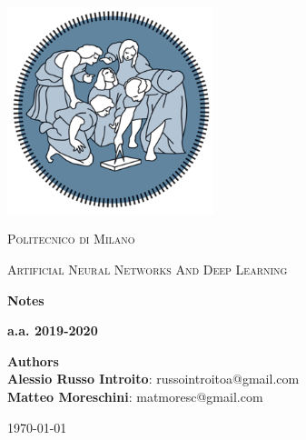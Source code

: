 \documentclass[12pt,a4paper]{article}
\begin{document}
\begin{titlepage}
	\centering
	\includegraphics[width=0.45\textwidth]{images/polimi.png}\par\vspace{1cm}
	{\scshape\LARGE Politecnico di Milano \par}
	\vspace{1cm}
	{\scshape\Large Artificial Neural Networks And Deep Learning \par}
	\vspace{1.5cm}
	{\LARGE\bfseries Notes\par}
	{\LARGE\bfseries a.a. 2019-2020\par}
	\vspace{0.7cm}
	{\textbf{Authors}\\
	\textbf{Alessio Russo Introito}: russointroitoa@gmail.com \\
	\textbf{Matteo Moreschini}: matmoresc@gmail.com \\
    }
	\vfill
	{\large \today\par}
\end{titlepage}



\tableofcontents

\newpage

%










%

\end{document}
